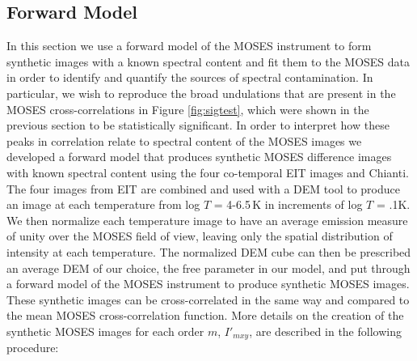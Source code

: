 			
	
	\subsection{Forward Model}\label{sec:fomod}
		In this section we use a forward model of the MOSES instrument to form synthetic images with a known spectral content and fit them to the MOSES data in order to identify and quantify the sources of spectral contamination. 
		In particular, we wish to reproduce the broad undulations that are present in the MOSES cross-correlations in Figure \ref{fig:sigtest}, which were shown in the previous section to be statistically significant.
		In order to interpret how these peaks in correlation relate to spectral content of the MOSES images we developed a forward model that produces synthetic MOSES difference images with known spectral content using the four co-temporal EIT images and Chianti.
		The four images from EIT are combined and used with a DEM tool to produce an image at each temperature from log $T$ = 4-6.5\,K in increments of log $T$ = .1K.
		We then normalize each temperature image to have an average emission measure of unity over the MOSES field of view, leaving only the spatial distribution of intensity at each temperature.
		The normalized DEM cube can then be prescribed an average DEM of our choice, the free parameter in our model, and put through a forward model of the MOSES instrument to produce synthetic MOSES images.
		These synthetic images can be cross-correlated in the same way and compared to the mean MOSES cross-correlation function. 
		More details on the creation of the synthetic MOSES images for each order $m$, $I'_{mxy}$, are described in the following procedure:

